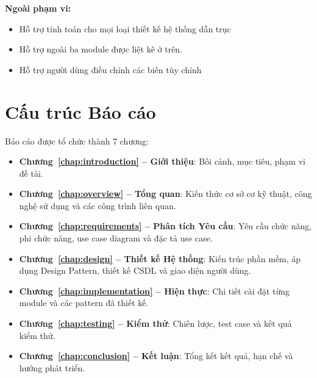 \textbf{Ngoài phạm vi:}
\begin{itemize}
    \item Hỗ trợ tính toán cho mọi loại thiết kế hệ thống dẫn trục
    \item Hỗ trợ ngoài ba module được liệt kê ở trên.
    \item Hỗ trợ người dùng điều chỉnh các biến tùy chỉnh
\end{itemize}

\section{Cấu trúc Báo cáo}
\label{sec:intro-structure}

Báo cáo được tổ chức thành 7 chương:

\begin{itemize}
  \item \textbf{Chương~\ref{chap:introduction} -- Giới thiệu}: Bối cảnh, mục tiêu, phạm vi đề tài.
  \item \textbf{Chương~\ref{chap:overview} -- Tổng quan}: Kiến thức cơ sở cơ kỹ thuật,
        công nghệ sử dụng và các công trình liên quan.
  \item \textbf{Chương~\ref{chap:requirements} -- Phân tích Yêu cầu}: Yêu cầu chức năng,
        phi chức năng, use case diagram và đặc tả use case.
  \item \textbf{Chương~\ref{chap:design} -- Thiết kế Hệ thống}: Kiến trúc phần mềm,
        áp dụng Design Pattern, thiết kế CSDL và giao diện người dùng.
  \item \textbf{Chương~\ref{chap:implementation} -- Hiện thực}: Chi tiết cài đặt
        từng module và các pattern đã thiết kế.
  \item \textbf{Chương~\ref{chap:testing} -- Kiểm thử}: Chiến lược, test case
        và kết quả kiểm thử.
  \item \textbf{Chương~\ref{chap:conclusion} -- Kết luận}: Tổng kết kết quả,
        hạn chế và hướng phát triển.
\end{itemize}
